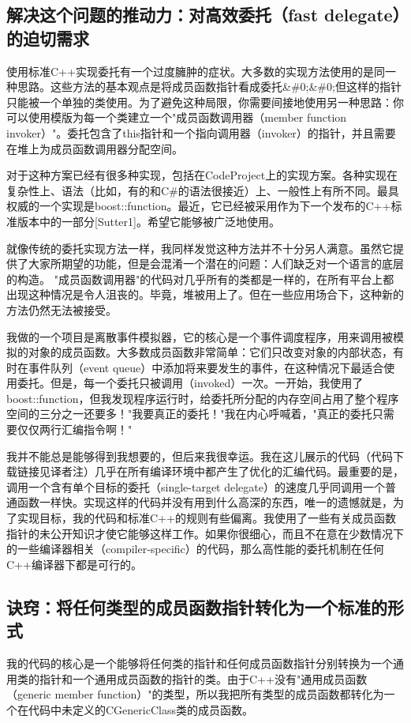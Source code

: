 \documentclass{article}
\begin{document}
\begin{CJK}{UTF8}{gbsn}
\subsection{解决这个问题的推动力：对高效委托（fast delegate）的迫切需求}
使用标准C++实现委托有一个过度臃肿的症状。大多数的实现方法使用的是同一种思路。这些方法的基本观点是将成员函数指针看成委托\&\#0;\&\#0;但这样的指针只能被一个单独的类使用。为了避免这种局限，你需要间接地使用另一种思路：你可以使用模版为每一个类建立一个"成员函数调用器（member function invoker）"。委托包含了this指针和一个指向调用器（invoker）的指针，并且需要在堆上为成员函数调用器分配空间。

对于这种方案已经有很多种实现，包括在CodeProject上的实现方案。各种实现在复杂性上、语法（比如，有的和C\#的语法很接近）上、一般性上有所不同。最具权威的一个实现是boost::function。最近，它已经被采用作为下一个发布的C++标准版本中的一部分[Sutter1]。希望它能够被广泛地使用。

就像传统的委托实现方法一样，我同样发觉这种方法并不十分另人满意。虽然它提供了大家所期望的功能，但是会混淆一个潜在的问题：人们缺乏对一个语言的底层的构造。 "成员函数调用器"的代码对几乎所有的类都是一样的，在所有平台上都出现这种情况是令人沮丧的。毕竟，堆被用上了。但在一些应用场合下，这种新的方法仍然无法被接受。

我做的一个项目是离散事件模拟器，它的核心是一个事件调度程序，用来调用被模拟的对象的成员函数。大多数成员函数非常简单：它们只改变对象的内部状态，有时在事件队列（event queue）中添加将来要发生的事件，在这种情况下最适合使用委托。但是，每一个委托只被调用（invoked）一次。一开始，我使用了boost::function，但我发现程序运行时，给委托所分配的内存空间占用了整个程序空间的三分之一还要多！"我要真正的委托！"我在内心呼喊着，"真正的委托只需要仅仅两行汇编指令啊！"

我并不能总是能够得到我想要的，但后来我很幸运。我在这儿展示的代码（代码下载链接见译者注）几乎在所有编译环境中都产生了优化的汇编代码。最重要的是，调用一个含有单个目标的委托（single-target delegate）的速度几乎同调用一个普通函数一样快。实现这样的代码并没有用到什么高深的东西，唯一的遗憾就是，为了实现目标，我的代码和标准C++的规则有些偏离。我使用了一些有关成员函数指针的未公开知识才使它能够这样工作。如果你很细心，而且不在意在少数情况下的一些编译器相关（compiler-specific）的代码，那么高性能的委托机制在任何C++编译器下都是可行的。

\subsection{诀窍：将任何类型的成员函数指针转化为一个标准的形式}
我的代码的核心是一个能够将任何类的指针和任何成员函数指针分别转换为一个通用类的指针和一个通用成员函数的指针的类。由于C++没有"通用成员函数（generic member function）"的类型，所以我把所有类型的成员函数都转化为一个在代码中未定义的CGenericClass类的成员函数。


\end{CJK}
\end{document}
